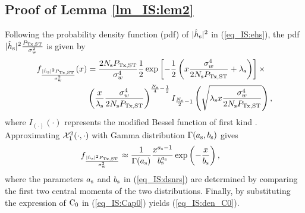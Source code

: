 {%

\section{}


\subsection{Proof of Lemma \ref{lm_IS:lem2}} \label{ssec:lem2} 
\begin{IEEEproof}
Following the probability density function (pdf) of $|\hat{h}_{\text{s}}|^2$ in (\ref{eq_IS:ehs}), the pdf $|\hat{h}_{\text{s}}|^2 \frac{P_{\text{Tx,ST}}}{\sigma^2_{\text{w}}}$ is given by
\begin{align}
f_{\frac{ |\hat{h}_{\text{s}}|^2 P_{\text{Tx,ST}}}{\sigma^2_{\text{w}}}}(x) &= \frac{2 N_{\text{s}} P_{\text{Tx,ST}}}{\sigma_w^4} \frac{1}{2} \exp\left[-\frac{1}{2} \left( x \frac{\sigma_w^4}{ 2 N_{\text{s}} P_{\text{Tx,ST}}} + \lambda_{\text{s}} \right)\right] \times \nonumber \\ \quad  & \left( \frac{x}{\lambda_{\text{s}}} \frac{\sigma_w^4}{ 2 N_{\text{s}} P_{\text{Tx,ST}}} \right)^{\frac{N_{\text{s}}}{4} - \frac{1}{2}} I_{\frac{N_{\text{s}}}{2}  - 1}  \left( \sqrt{\lambda_{\text{s}} x \frac{\sigma_w^4}{ 2 N_{\text{s}} P_{\text{Tx,ST}}} }  \right), \nonumber 
\end{align}
where $I_{(\cdot)}(\cdot)$ represents the modified Bessel function of first kind \cite{grad}. Approximating $\ncchi2(\cdot, \cdot)$ with Gamma distribution $\Gamma(a_{\text{s}}, b_{\text{s}})$ \cite{abramo} gives 
\begin{align}
f_{\frac{ |\hat{h}_{\text{s}}|^2 P_{\text{Tx,ST}}}{\sigma^2_{\text{w}}}} & \approx \frac{1}{\Gamma(a_{\text{s}})} \frac{x^{a_{\text{s}} - 1}}{b_{\text{s}}^{a_{\text{s}}}} \exp\left(-\frac{x}{b_{\text{s}}}\right), 
\label{eq_IS:dsnrs}
\end{align} 
where the parameters $a_{\text{s}}$ and $b_{\text{s}}$ in (\ref{eq_IS:dsnrs}) are determined by comparing the first two central moments of the two distributions. Finally, by substituting the expression of $\text{C}_{\text{0}}$ in (\ref{eq_IS:Cap0}) yields (\ref{eq_IS:den_C0}). 
\end{IEEEproof}

}
